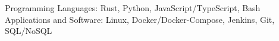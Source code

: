 
\begin{cvskills}
  \cvskill
    {Programming Languages:} %
    {Rust, Python, JavaScript/TypeScript, Bash} %
  \cvskill
    {Applications and Software:} %
    {Linux, Docker/Docker-Compose, Jenkins, Git, SQL/NoSQL} %
\end{cvskills}